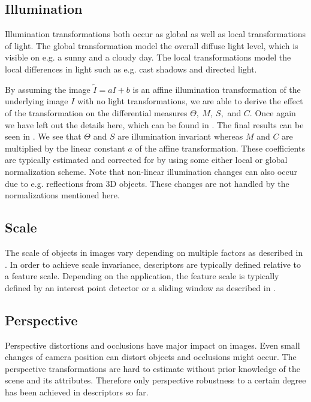 \documentclass[thesis.tex]{subfiles}
\begin{document}
\subsection{Illumination}
\label{sec:illumination}
Illumination transformations both occur as global as well as local transformations of light. The global transformation model the overall diffuse light level, which is visible on e.g. a sunny and a cloudy day. The local transformations model the local differences in light such as e.g. cast shadows and directed light.

By assuming the image $\tilde{I} = a I + b$ is an affine illumination transformation of the underlying image $I$ with no light transformations, we are able to derive the effect of the transformation on the differential measures $\Theta,~M,~S,$ and $C$. Once again we have left out the details here, which can be found in . The final results can be seen in . We see that $\Theta$ and $S$ are illumination invariant whereas $M$ and $C$ are multiplied by the linear constant $a$ of the affine transformation. These coefficients are typically estimated and corrected for by using some either local or global normalization scheme. Note that non-linear illumination changes can also occur due to e.g. reflections from 3D objects. These changes are not handled by the normalizations mentioned here.

\subsection{Scale}
\label{sec:scaleInvariance}
The scale of objects in images vary depending on multiple factors as described in . In order to achieve scale invariance, descriptors are typically defined relative to a feature scale. Depending on the application, the feature scale is typically defined by an interest point detector or a sliding window as described in .

\subsection{Perspective}
Perspective distortions and occlusions have major impact on images. Even small changes of camera position can distort objects and occlusions might occur. The perspective transformations are hard to estimate without prior knowledge of the scene and its attributes. Therefore only perspective robustness to a certain degree has been achieved in descriptors so far.
\end{document}
